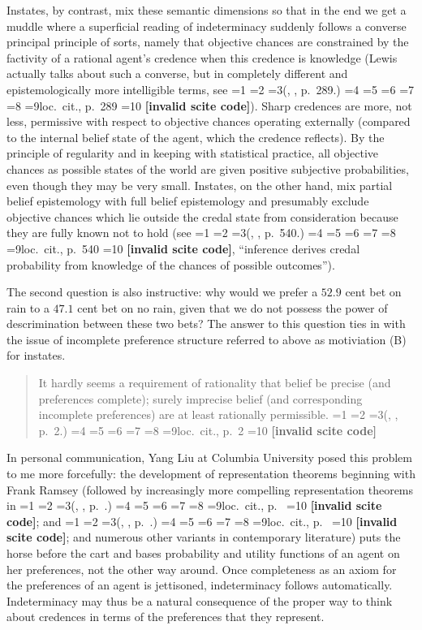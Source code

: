 \documentclass[journal]{IEEEtran}
\newcommand{\qeins}[1]{``#1''}
\newif\ifNumericalOrYear
\newcommand{\PageP}{p.~}
\newcommand{\PageP}{}
\newcommand{\scite}[3]{\ifnum#1=1\ifNumericalOrYear\citep{#2}\else\citeyearpar{#2}\fi\else
\ifnum#1=2\ifNumericalOrYear\citep[#3]{#2}\else\citep[{\PageP}#3]{#2}\fi\else
\ifnum#1=3\ifNumericalOrYear(\citet[#3]{#2})\else(\citeauthor{#2}, \citeyear{#2}, {\PageP}#3.)\fi\else
\ifnum#1=4\ifNumericalOrYear\citet{#2}\else\citet{#2}\fi\else
\ifnum#1=5\ifNumericalOrYear(\citet{#2})\else\citep{#2}\fi\else
\ifnum#1=6\ifNumericalOrYear(\citet[#3]{#2})\else\citep[{\PageP}#3]{#2}\fi\else
\ifnum#1=7\ifNumericalOrYear\citep{#2}\else\citealp{#2}\fi\else
\ifnum#1=8\ifNumericalOrYear\citep[#3]{#2}\else\citealp[{\PageP}#3]{#2}\fi\else
\ifnum#1=9\ifNumericalOrYear\citep[#3]{#2}\else{}loc.\ cit., {\PageP}#3\fi\else
\ifnum#1=10\ifNumericalOrYear\citep{#2}\else\citeyear{#2}\fi\else
\textbf{[invalid scite code]}\fi\fi\fi\fi\fi\fi\fi\fi\fi\fi}
\newenvironment{quotex}{\begin{quote}\begin{footnotesize}}{\end{footnotesize}\end{quote}}
\begin{document}
Instates, by contrast, mix these semantic dimensions so that in the
end we get a muddle where a superficial reading of indeterminacy
suddenly follows a converse principal principle of sorts, namely that
objective chances are constrained by the factivity of a rational
agent's credence when this credence is knowledge (Lewis actually talks
about such a converse, but in completely different and
epistemologically more intelligible terms, see
\scite{8}{lewis81}{289}). Sharp credences are more, not less,
permissive with respect to objective chances operating externally
(compared to the internal belief state of the agent, which the
credence reflects). By the principle of regularity and in keeping with
statistical practice, all objective chances as possible states of the
world are given positive subjective probabilities, even though they
may be very small. Instates, on the other hand, mix partial belief
epistemology with full belief epistemology and presumably exclude
objective chances which lie outside the credal state from
consideration because they are fully known not to hold (see
\scite{8}{levi81}{540}, \qeins{inference derives credal probability
  from knowledge of the chances of possible outcomes}).

The second question is also instructive: why would we prefer a $52.9$
cent bet on rain to a $47.1$ cent bet on no rain, given that we do not
possess the power of descrimination between these two bets? The answer
to this question ties in with the issue of incomplete preference
structure referred to above as motiviation (B) for instates.

\begin{quotex}
  It hardly seems a requirement of rationality that belief be precise
  (and preferences complete); surely imprecise belief (and
  corresponding incomplete preferences) are at least rationally
  permissible. \scite{3}{bradleysteele13}{2}
\end{quotex}

In personal communication, Yang Liu at Columbia University posed this
problem to me more forcefully: the development of representation
theorems beginning with Frank Ramsey (followed by increasingly more
compelling representation theorems in \scite{7}{savage54}{}; and
\scite{7}{jeffrey65}{}; and numerous other variants in contemporary
literature) puts the horse before the cart and bases probability and
utility functions of an agent on her preferences, not the other way
around. Once completeness as an axiom for the preferences of an agent
is jettisoned, indeterminacy follows automatically. Indeterminacy may
thus be a natural consequence of the proper way to think about
credences in terms of the preferences that they represent.
\end{document}
